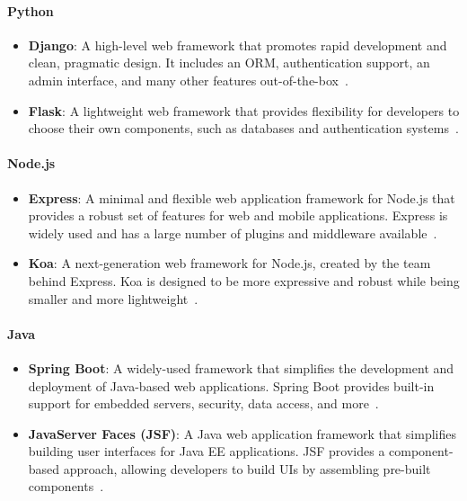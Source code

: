 \paragraph{Python}
\begin{itemize}
    \item \textbf{Django}: A high-level web framework that promotes rapid development and clean, pragmatic design. It includes an ORM, authentication support, an admin interface, and many other features out-of-the-box~\cite{django}.
    \item \textbf{Flask}: A lightweight web framework that provides flexibility for developers to choose their own components, such as databases and authentication systems~\cite{flask}.
\end{itemize}

\paragraph{Node.js}
\begin{itemize}
    \item \textbf{Express}: A minimal and flexible web application framework for Node.js that provides a robust set of features for web and mobile applications. Express is widely used and has a large number of plugins and middleware available~\cite{express}.
    \item \textbf{Koa}: A next-generation web framework for Node.js, created by the team behind Express. Koa is designed to be more expressive and robust while being smaller and more lightweight~\cite{koa}.
\end{itemize}

\paragraph{Java}
\begin{itemize}
    \item \textbf{Spring Boot}: A widely-used framework that simplifies the development and deployment of Java-based web applications. Spring Boot provides built-in support for embedded servers, security, data access, and more~\cite{springboot}.
    \item \textbf{JavaServer Faces (JSF)}: A Java web application framework that simplifies building user interfaces for Java EE applications. JSF provides a component-based approach, allowing developers to build UIs by assembling pre-built components~\cite{jsf}.
\end{itemize}


